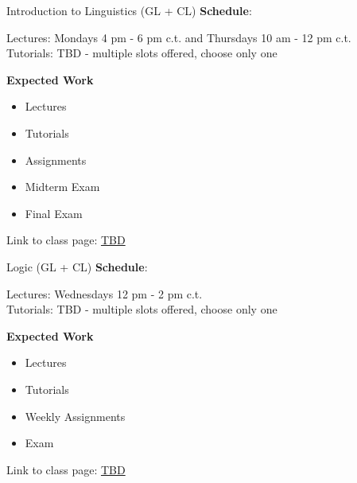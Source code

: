 \documentclass[aspectratio=169,hyperref={unicode},xcolor={dvipsnames}]{beamer}
\begin{document}
\begin{frame}{Introduction to Linguistics \hspace{7.4cm} (GL + CL)}
		\textbf{Schedule}:
		
		Lectures: Mondays 4 pm - 6 pm c.t. and Thursdays 10 am - 12 pm c.t.\\
		Tutorials: TBD - multiple slots offered, choose only one
		\newline
		
		\textbf{Expected Work}
		\begin{itemize}
			\item Lectures
			\item Tutorials
			\item Assignments
			\item Midterm Exam
			\item Final Exam
		\end{itemize}
	\begin{center}
	Link to class page: \url{TBD}
\end{center}
\end{frame}

\begin{frame}{Logic  \hspace{11.7cm} (GL + CL)}
		\textbf{Schedule}:
		
		Lectures: Wednesdays 12 pm - 2 pm c.t.\\
		Tutorials: TBD - multiple slots offered, choose only one
		\newline
		
		\textbf{Expected Work}
		\begin{itemize}
			\item Lectures
			\item Tutorials
			\item Weekly Assignments
			\item Exam
		\end{itemize}
		
		\begin{center}
	Link to class page: \url{TBD}
\end{center}
\end{frame}
\end{document}

